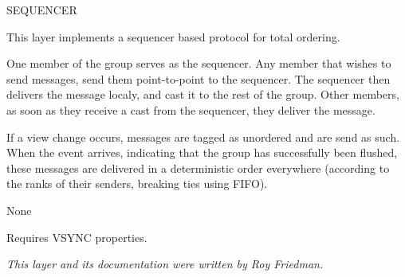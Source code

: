 %
%
%
\begin{Layer}{SEQUENCER}

This layer implements a sequencer based protocol for total ordering.

\begin{Protocol}
One member of the group serves as the sequencer. Any member that wishes to
send messages, send them point-to-point to the sequencer. The sequencer then
delivers the message localy, and cast it to the rest of the group. Other
members, as soon as they receive a cast from the sequencer, they deliver
the message.

If a view change occurs, messages are tagged as unordered and are send as
such.
When the  event arrives, indicating that the group has successfully
been flushed, these messages are delivered in a deterministic order everywhere
(according to the ranks of their senders, breaking ties using FIFO).
\end{Protocol}

\begin{Parameters}
\item None
\end{Parameters}

\begin{Properties}
\item
Requires VSYNC properties.
\end{Properties}

\begin{Sources}
\end{Sources}

\begin{GenEvent}
\end{GenEvent}

\begin{Testing}
\item
\todo{}
\end{Testing}

\emph{This layer and its documentation were written by Roy Friedman.}
\end{Layer}
